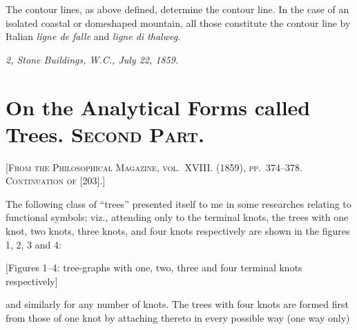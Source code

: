\documentclass[11pt,a4paper]{book}
\begin{document}
The contour lines, as above defined, determine the contour line. In the case of an isolated coastal or domeshaped mountain, all those constitute the contour line by Italian \textit{ligne de falle} and \textit{ligne di thalweg}.

\smallskip
\noindent\textit{2, Stone Buildings, W.C., July 22, 1859.}

\newpage


\setcounter{page}{112}

\section*{On the Analytical Forms called Trees. \textsc{Second Part.}}
\label{paper:247}

\textsc{[From the Philosophical Magazine, vol.~XVIII. (1859), pp.~374--378. Continuation of [203].]}

\medskip

The following class of ``trees'' presented itself to me in some researches relating to functional symbols; viz., attending only to the terminal knots, the trees with one knot, two knots, three knots, and four knots respectively are shown in the figures 1, 2, 3 and 4:

\begin{center}
[Figures 1--4: tree-graphs with one, two, three and four terminal knots respectively]
\end{center}

\noindent
and similarly for any number of knots. The trees with four knots are formed first from those of one knot by attaching thereto in every possible way (one way only)

\setcounter{page}{113}
\end{document}
